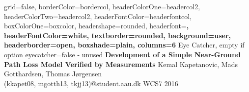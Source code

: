 \documentclass[a0paper,landscape]{baposter}
\begin{document}

\background{
}

\begin{poster}{
	grid=false,
	borderColor=bordercol,
	headerColorOne=headercol2,
	headerColorTwo=headercol2,
	headerFontColor=headerfontcol,
	boxColorOne=boxcolor,
	headershape=rounded,
	headerfont=\Large\sf\bf,
	headerFontColor=white,
	textborder=rounded,
	background=user,
	headerborder=open,
  boxshade=plain,
  columns=6
}
{
	Eye Catcher, empty if option eyecatcher=false - unused
}
{\sf\bf
	Development of a Simple Near-Ground Path Loss Model Verified by Measurements
}
{
	\vspace{1em} Kemal Kapetanovic, Mads Gotthardsen, Thomas Jørgensen\\
	{\smaller (kkapet08, mgotth13, tkjj13)@student.aau.dk WCS7 2016}
}
{
\setlength\fboxsep{0pt}
\setlength\fboxrule{0.5pt}
	\fbox{
		\begin{minipage}{14em}
		\end{minipage}
	}
}


\end{poster}
\end{document}
